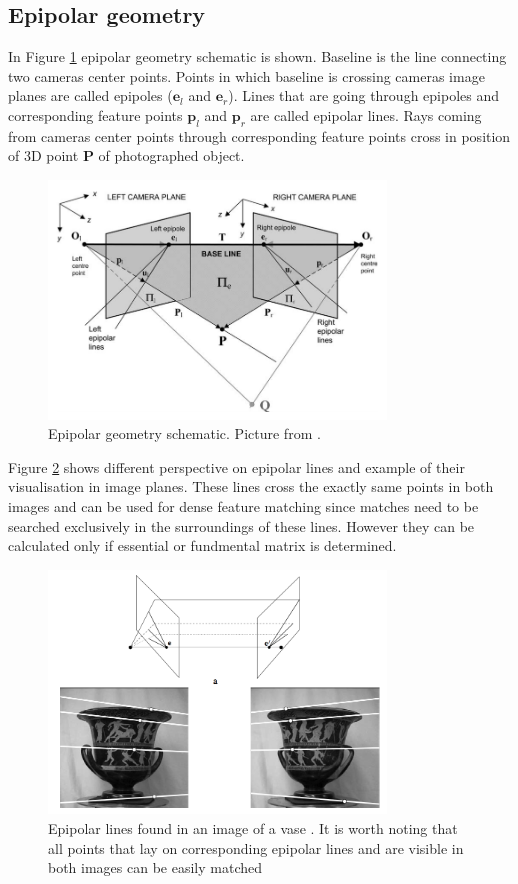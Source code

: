 \subsection{Epipolar geometry}
In Figure \ref{fig:epipolar_geometry} epipolar geometry schematic is shown. Baseline is the line connecting two cameras center points. Points in which baseline is crossing cameras image planes are called epipoles ($\textbf{e}_l$ and $\textbf{e}_r$). Lines that are going through epipoles and corresponding feature points $\textbf{p}_l$ and $\textbf{p}_r$ are called epipolar lines. Rays coming from cameras center points through corresponding feature points cross in position of 3D point \textbf{P} of photographed object.
\begin{figure}[!h]
    \centering
    \includegraphics[width=0.8\textwidth]{epipolar_geometry}
    \caption{Epipolar geometry schematic. Picture from \cite{Cyganek3dVision}. }
    \label{fig:epipolar_geometry}
\end{figure}
Figure \ref{fig:EpipolarGeometry} shows different perspective on epipolar lines and example of their visualisation in image planes. These lines cross the exactly same points in both images and can be used for dense feature matching since matches need to be searched exclusively in the surroundings of these lines. However they can be calculated only if essential or fundmental matrix is determined.
\begin{figure}[!h]
    \centering
    \includegraphics[width=0.8\textwidth]{EpipolarGeometry}
    \caption[Epipolar lines found in an image of a vase]{Epipolar lines found in an image of a vase \cite{HartleyMultipleView}. It is worth noting that all points that lay on corresponding epipolar lines and are visible in both images can be easily matched}
    \label{fig:EpipolarGeometry}
\end{figure} \\
